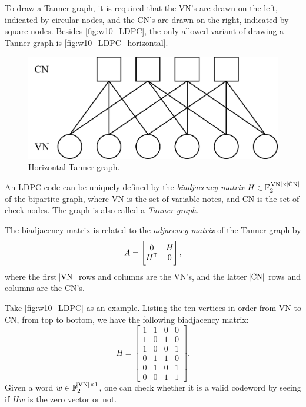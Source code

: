To draw a Tanner graph, it is required that the VN's are drawn on the left, indicated by circular nodes, and the CN's are drawn on the right, indicated by square nodes. Besides \autoref{fig:w10_LDPC}, the only allowed variant of drawing a Tanner graph is \autoref{fig:w10_LDPC_horizontal}.

\begin{figure}[H]
    \centering
    \includegraphics[width=0.5\linewidth]{figures/w10_LDPC_horizontal.png}
    \caption{Horizontal Tanner graph.}
    \label{fig:w10_LDPC_horizontal}
\end{figure}

\begin{definition}
    An LDPC code can be uniquely defined by the \textit{biadjacency matrix} $H\in\mathbb{F}_2^{\abs{\mathrm{VN}}\times\abs{\mathrm{CN}}}$ of the bipartite graph, where $\mathrm{VN}$ is the set of variable notes, and $\mathrm{CN}$ is the set of check nodes. The graph is also called a \textit{Tanner graph}.

    The biadjacency matrix is related to the \textit{adjacency matrix} of the Tanner graph by
    \begin{equation}
        A = \left[\begin{matrix}
            0 & H \\ H^{\mathsf{T}} & 0
        \end{matrix}\right],
    \end{equation}
    where the first $\abs{\mathrm{VN}}$ rows and columns are the VN's, and the latter $\abs{\mathrm{CN}}$ rows and columns are the CN's.
\end{definition}

\begin{example}
    Take \autoref{fig:w10_LDPC} as an example. Listing the ten vertices in order from VN to CN, from top to bottom, we have the following biadjacency matrix:
    \begin{equation*}
        H = \left[\begin{matrix}
            1 & 1 & 0 & 0 \\
            1 & 0 & 1 & 0 \\
            1 & 0 & 0 & 1 \\
            0 & 1 & 1 & 0 \\
            0 & 1 & 0 & 1 \\
            0 & 0 & 1 & 1 
        \end{matrix}\right].
    \end{equation*}
    Given a word $w\in\mathbb{F}_2^{\abs{\mathrm{VN}}\times 1}$, one can check whether it is a valid codeword by seeing if $Hw$ is the zero vector or not.
\end{example}

